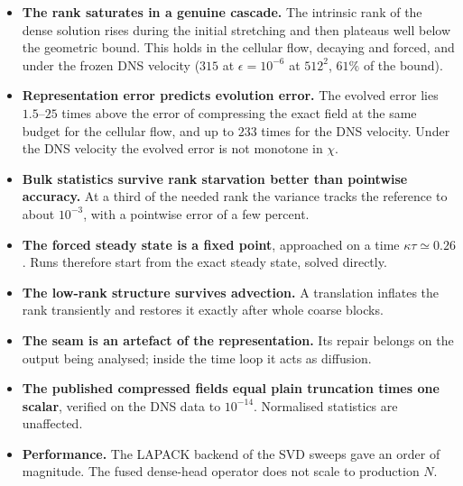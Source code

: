 \documentclass[aps,prfluids,reprint,onecolumn,amsmath,amssymb,nofootinbib,floatfix]{revtex4-2}
\begin{document}
\begin{itemize}
\item \textbf{The rank saturates in a genuine cascade.} The intrinsic rank of the
      dense solution rises during the initial stretching and then plateaus well
      below the geometric bound. This holds in the cellular flow, decaying and
      forced, and under the frozen DNS velocity ($315$ at $\epsilon=10^{-6}$ at
      $512^2$, $61\%$ of the bound).
\item \textbf{Representation error predicts evolution error.} The evolved error
      lies $1.5$--$25$ times above the error of compressing the exact field at
      the same budget for the cellular flow, and up to $233$ times for the DNS
      velocity. Under the DNS velocity the evolved error is not monotone in
      $\chi$.
\item \textbf{Bulk statistics survive rank starvation better than pointwise
      accuracy.} At a third of the needed rank the variance tracks the
      reference to about $10^{-3}$, with a pointwise error of a few percent.
\item \textbf{The forced steady state is a fixed point}, approached on a time
      $\kappa\tau\simeq0.26$. Runs therefore start from the exact steady state,
      solved directly.
\item \textbf{The low-rank structure survives advection.} A translation inflates
      the rank transiently and restores it exactly after whole coarse blocks.
\item \textbf{The seam is an artefact of the representation.} Its repair belongs
      on the output being analysed; inside the time loop it acts as diffusion.
\item \textbf{The published compressed fields equal plain truncation times one
      scalar}, verified on the DNS data to $10^{-14}$. Normalised statistics are
      unaffected.
\item \textbf{Performance.} The LAPACK backend of the SVD sweeps gave an order of
      magnitude. The fused dense-head operator does not scale to production
      $N$.
\end{itemize}
\end{document}
